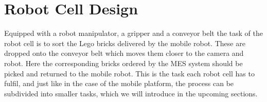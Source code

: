 \chapter{Robot Cell Design}\label{chap:robot_cell_chapter}
Equipped with a robot manipulator, a gripper and a conveyor belt the task of the robot cell is to sort the Lego bricks delivered by the mobile robot. These are dropped onto the conveyor belt which moves them closer to the camera and robot. Here the corresponding bricks ordered by the MES system should be picked and returned to the mobile robot. This is the task each robot cell has to fulfil, and just like in the case of the mobile platform, the process can be subdivided into smaller tasks, which we will introduce in the upcoming sections.
















